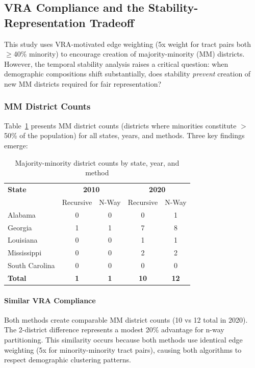 \subsection{VRA Compliance and the Stability-Representation Tradeoff}
\label{sec:vra-compliance}

This study uses VRA-motivated edge weighting (5x weight for tract pairs both $\geq$40\% minority) to encourage creation of majority-minority (MM) districts. However, the temporal stability analysis raises a critical question: when demographic compositions shift substantially, does stability \textit{prevent} creation of new MM districts required for fair representation?

\subsubsection{MM District Counts}

Table~\ref{tab:mm-counts} presents MM district counts (districts where minorities constitute $>$50\% of the population) for all states, years, and methods. Three key findings emerge:

\begin{table}[htbp]
\centering
\caption{Majority-minority district counts by state, year, and method}
\label{tab:mm-counts}
\begin{tabular}{lcccc}
\toprule
\textbf{State} & \multicolumn{2}{c}{\textbf{2010}} & \multicolumn{2}{c}{\textbf{2020}} \\
               & Recursive & N-Way & Recursive & N-Way \\
\midrule
Alabama        & 0 & 0 & 0 & 1 \\
Georgia        & 1 & 1 & 7 & 8 \\
Louisiana      & 0 & 0 & 1 & 1 \\
Mississippi    & 0 & 0 & 2 & 2 \\
South Carolina & 0 & 0 & 0 & 0 \\
\midrule
\textbf{Total} & \textbf{1} & \textbf{1} & \textbf{10} & \textbf{12} \\
\bottomrule
\end{tabular}
\end{table}

\paragraph{Similar VRA Compliance} Both methods create comparable MM district counts (10 vs 12 total in 2020). The 2-district difference represents a modest 20\% advantage for n-way partitioning. This similarity occurs because both methods use identical edge weighting (5x for minority-minority tract pairs), causing both algorithms to respect demographic clustering patterns.

